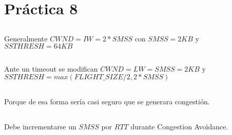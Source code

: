 \section{Práctica 8}

\setcounter{subsection}{2}
\subsection{}
Generalmente $CWND = IW = 2 * SMSS$ con $SMSS = 2KB$ y $SSTHRESH = 64KB$

\subsection{}
Ante un timeout se modifican $CWND = LW = SMSS = 2KB$ y $SSTHRESH = max(FLIGHT\_SIZE / 2, 2 * SMSS)$

\subsection{}
Porque de esa forma sería casi seguro que se generara congestión. 

\subsection{}
Debe incrementarse un $SMSS$ por $RTT$ durante Congestion Avoidance.


